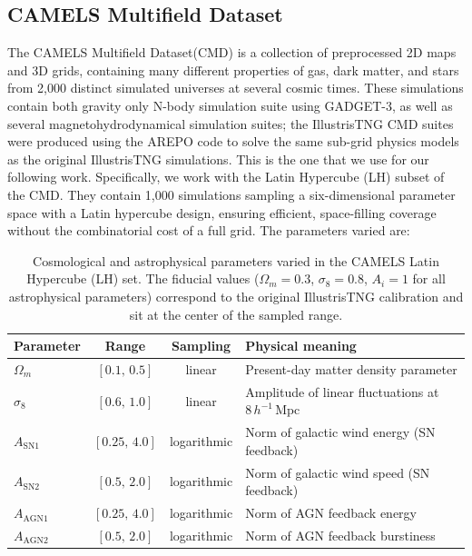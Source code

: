 \subsection{CAMELS Multifield Dataset}
The CAMELS Multifield Dataset(CMD) is a collection of preprocessed 2D maps and 3D grids, containing many different properties of gas, dark matter, and stars from 2,000 distinct simulated universes at several cosmic times. These simulations contain both gravity only N-body simulation suite using GADGET-3, as well as several magnetohydrodynamical simulation suites; the IllustrisTNG CMD suites were produced using the AREPO code to solve the same sub-grid physics models as the original IllustrisTNG simulations. This is the one that we use for our following work.
Specifically, we work with the Latin Hypercube (LH) subset of the CMD. They contain 1,000 simulations sampling a six-dimensional parameter space with a Latin hypercube design, ensuring efficient, space-filling coverage without the combinatorial cost of a full grid. The parameters varied are:

\begin{table}
    \centering
    \caption{Cosmological and astrophysical parameters varied in the CAMELS Latin Hypercube (LH) set. The fiducial values ($\Omega_m = 0.3$, $\sigma_8 = 0.8$, $A_i = 1$ for all astrophysical parameters) correspond to the original IllustrisTNG calibration and sit at the center of the
    sampled range.}
    \label{tab:lh_params}
    \begin{tabular}{l c c l}
        \hline
        \textbf{Parameter} & \textbf{Range} & \textbf{Sampling} & \textbf{Physical meaning} \\
        \hline
        $\Omega_m$          & $[0.1,\, 0.5]$   & linear      & Present-day matter density parameter \\
        $\sigma_8$          & $[0.6,\, 1.0]$   & linear      & Amplitude of linear fluctuations at $8\,h^{-1}\,\mathrm{Mpc}$ \\
        $A_{\mathrm{SN1}}$  & $[0.25,\, 4.0]$  & logarithmic & Norm of galactic wind energy (SN feedback) \\
        $A_{\mathrm{SN2}}$  & $[0.5,\, 2.0]$   & logarithmic & Norm of galactic wind speed (SN feedback) \\
        $A_{\mathrm{AGN1}}$ & $[0.25,\, 4.0]$  & logarithmic & Norm of AGN feedback energy \\
        $A_{\mathrm{AGN2}}$ & $[0.5,\, 2.0]$   & logarithmic & Norm of AGN feedback burstiness \\
        \hline
    \end{tabular}
\end{table}

